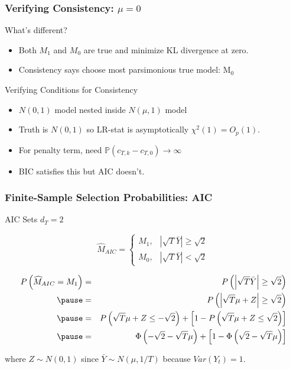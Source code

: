 \begin{frame}
  \frametitle{Verifying Consistency: $\mu = 0$}

  \begin{block}{What's different?}
  \begin{itemize}
    \item Both $M_1$ and $M_0$ are true and minimize KL divergence at zero. 
    \item \alert{Consistency} says choose most parsimonious true model: $\text{M}_0$
  \end{itemize}
  \end{block}

  \pause

  \begin{block}{Verifying Conditions for Consistency}
    \begin{itemize}
      \item $N(0,1)$ model nested inside $N(\mu,1)$ model
      \item Truth is $N(0,1)$ so LR-stat is asymptotically $\chi^2(1) = O_p(1)$.
      \item For penalty term, need $\mathbb{P}(c_{T,k} - c_{T,0})\rightarrow \infty$
      \item BIC satisfies this but AIC doesn't.
    \end{itemize}
    
  \end{block}
\end{frame}
\begin{frame}
  \frametitle{Finite-Sample Selection Probabilities: AIC}
  \begin{block}{AIC Sets $d_T = 2$}


	$$\widehat{M}_{AIC} = \left\{\begin{array}
		{cc} M_1, &|\sqrt{T}\bar{Y}| \geq \sqrt{2} \\
		M_0, & |\sqrt{T} \bar{Y}| < \sqrt{2}
	\end{array} \right.$$
  \end{block}

  \pause

  \vspace{-2em}

    \footnotesize
	\begin{eqnarray*}
		P\left(\widehat{M}_{AIC} = M_1\right) &=& P\left(\left|\sqrt{T}\bar{Y} \right| \geq \sqrt{2}  \right)\\ \pause
		&=& P\left(\left|\sqrt{T}\mu + Z\right| \geq \sqrt{2}  \right)\\\pause
		&=& P\left(\sqrt{T}\mu + Z \leq -\sqrt{2}\right) + \left[1 - P\left(\sqrt{T} \mu +Z \leq \sqrt{2}\right) \right]\\\pause
			&=& \Phi\left(-\sqrt{2} - \sqrt{T}\mu\right) + \left[1 -  \Phi\left(\sqrt{2} - \sqrt{T} \mu \right)\right]
	\end{eqnarray*}

  \normalsize
where $Z \sim N(0,1)$ since $\bar{Y} \sim N(\mu, 1/T)$ because $Var(Y_t)=1$.
\end{frame}
